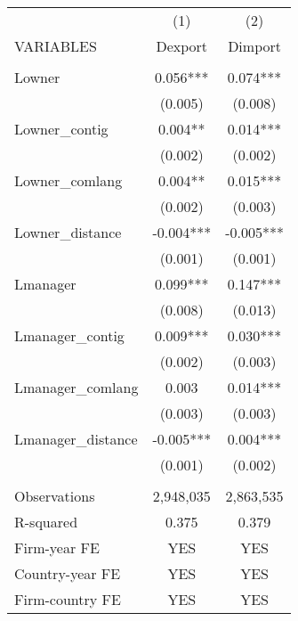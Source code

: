 \begin{tabular}{lcc} \hline
 & (1) & (2) \\
VARIABLES & Dexport & Dimport \\ \hline
 &  &  \\
Lowner & 0.056*** & 0.074*** \\
 & (0.005) & (0.008) \\
Lowner\_contig & 0.004** & 0.014*** \\
 & (0.002) & (0.002) \\
Lowner\_comlang & 0.004** & 0.015*** \\
 & (0.002) & (0.003) \\
Lowner\_distance & -0.004*** & -0.005*** \\
 & (0.001) & (0.001) \\
Lmanager & 0.099*** & 0.147*** \\
 & (0.008) & (0.013) \\
Lmanager\_contig & 0.009*** & 0.030*** \\
 & (0.002) & (0.003) \\
Lmanager\_comlang & 0.003 & 0.014*** \\
 & (0.003) & (0.003) \\
Lmanager\_distance & -0.005*** & 0.004*** \\
 & (0.001) & (0.002) \\
 &  &  \\
Observations & 2,948,035 & 2,863,535 \\
R-squared & 0.375 & 0.379 \\
Firm-year FE & YES & YES \\
Country-year FE & YES & YES \\
 Firm-country FE & YES & YES \\ \hline
\end{tabular}
